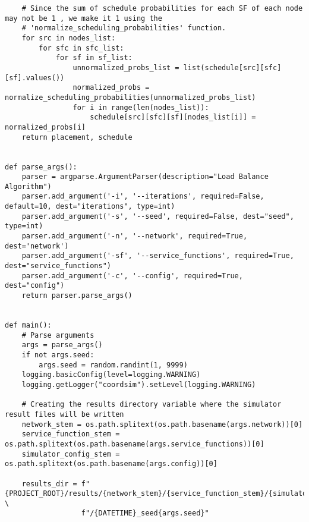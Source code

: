 \begin{lstlisting}
    # Since the sum of schedule probabilities for each SF of each node may not be 1 , we make it 1 using the
    # 'normalize_scheduling_probabilities' function.
    for src in nodes_list:
        for sfc in sfc_list:
            for sf in sf_list:
                unnormalized_probs_list = list(schedule[src][sfc][sf].values())
                normalized_probs = normalize_scheduling_probabilities(unnormalized_probs_list)
                for i in range(len(nodes_list)):
                    schedule[src][sfc][sf][nodes_list[i]] = normalized_probs[i]
    return placement, schedule


def parse_args():
    parser = argparse.ArgumentParser(description="Load Balance Algorithm")
    parser.add_argument('-i', '--iterations', required=False, default=10, dest="iterations", type=int)
    parser.add_argument('-s', '--seed', required=False, dest="seed", type=int)
    parser.add_argument('-n', '--network', required=True, dest='network')
    parser.add_argument('-sf', '--service_functions', required=True, dest="service_functions")
    parser.add_argument('-c', '--config', required=True, dest="config")
    return parser.parse_args()


def main():
    # Parse arguments
    args = parse_args()
    if not args.seed:
        args.seed = random.randint(1, 9999)
    logging.basicConfig(level=logging.WARNING)
    logging.getLogger("coordsim").setLevel(logging.WARNING)

    # Creating the results directory variable where the simulator result files will be written
    network_stem = os.path.splitext(os.path.basename(args.network))[0]
    service_function_stem = os.path.splitext(os.path.basename(args.service_functions))[0]
    simulator_config_stem = os.path.splitext(os.path.basename(args.config))[0]

    results_dir = f"{PROJECT_ROOT}/results/{network_stem}/{service_function_stem}/{simulator_config_stem}" \
                  f"/{DATETIME}_seed{args.seed}"


\end{lstlisting}
